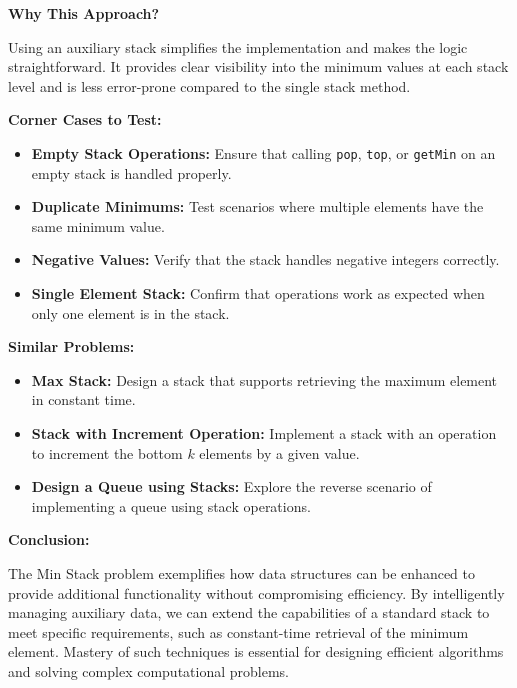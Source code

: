 \textbf{Why This Approach?}

Using an auxiliary stack simplifies the implementation and makes the logic straightforward. It provides clear visibility into the minimum values at each stack level and is less error-prone compared to the single stack method.

\textbf{Corner Cases to Test:}

\begin{itemize}
    \item \textbf{Empty Stack Operations:} Ensure that calling \texttt{pop}, \texttt{top}, or \texttt{getMin} on an empty stack is handled properly.
    \item \textbf{Duplicate Minimums:} Test scenarios where multiple elements have the same minimum value.
    \item \textbf{Negative Values:} Verify that the stack handles negative integers correctly.
    \item \textbf{Single Element Stack:} Confirm that operations work as expected when only one element is in the stack.
\end{itemize}

\textbf{Similar Problems:}

\begin{itemize}
    \item \textbf{Max Stack:} Design a stack that supports retrieving the maximum element in constant time.
    \item \textbf{Stack with Increment Operation:} Implement a stack with an operation to increment the bottom \(k\) elements by a given value.
    \item \textbf{Design a Queue using Stacks:} Explore the reverse scenario of implementing a queue using stack operations.
\end{itemize}

\textbf{Conclusion:}

The Min Stack problem exemplifies how data structures can be enhanced to provide additional functionality without compromising efficiency. By intelligently managing auxiliary data, we can extend the capabilities of a standard stack to meet specific requirements, such as constant-time retrieval of the minimum element. Mastery of such techniques is essential for designing efficient algorithms and solving complex computational problems.